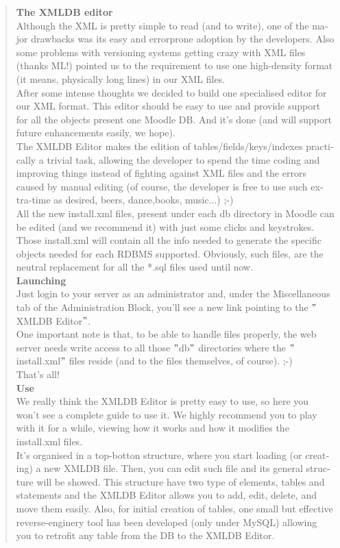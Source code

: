 \documentclass[a4paper]{report}  %
\begin{document}
\begin{otherlanguage}{english}
\begin{quote}
{\bfseries The XMLDB editor}\\
Although the XML is pretty simple to read (and to write), one of the major drawbacks was its easy and errorprone adoption by the developers. Also some problems with versioning systems getting crazy with XML files (thanks ML!) pointed us to the requirement to use one high-density format (it means, physically long lines) in our XML files.\\
After some intense thoughts we decided to build one specialised editor for our XML format. This editor should be easy to use and provide support for all the objects present one Moodle DB. And it's done (and will support future enhancements easily, we hope).\\
The XMLDB Editor makes the edition of tables/fields/keys/indexes practically a trivial task, allowing the developer to spend the time coding and improving things instead of fighting against XML files and the errors caused by manual editing (of course, the developer is free to use such extra-time as desired, beers, dance,books, music...) ;-)\\
All the new install.xml files, present under each db directory in Moodle can be edited (and we recommend it) with just some clicks and keystrokes. Those install.xml will contain all the info needed to generate the specific objects needed for each RDBMS supported. Obviously, such files, are the neutral replacement for all the *.sql files used until now.\\
{\bfseries Launching}\\
Just login to your server as an administrator and, under the Miscellaneous tab of the Administration Block, you'll see a new link pointing to the $"$XMLDB Editor$"$.\\
One important note is that, to be able to handle files properly, the web server needs write access to all those $"$db$"$ directories where the $"$install.xml$"$ files reside (and to the files themselves, of course). ;-)\\
That's all!\\
{\bfseries Use}\\
We really think the XMLDB Editor is pretty easy to use, so here you won't see a complete guide to use it. We highly recommend you to play with it for a while, viewing how it works and how it modifies the install.xml files.\\
It's organised in a top-botton structure, where you start loading (or creating) a new XMLDB file. Then, you can edit such file and its general structure will be showed. This structure have two type of elements, tables and statements and the XMLDB Editor allows you to add, edit, delete, and move them easily. Also, for initial creation of tables, one small but effective reverse-enginery tool has been developed (only under MySQL) allowing you to retrofit any table from the DB to the XMLDB Editor.\\

\end{quote}
\end{otherlanguage}
\end{document}
